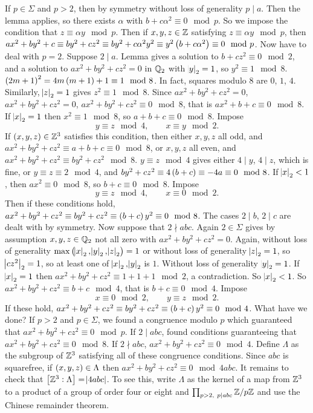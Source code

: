 If $ p \in \Sigma $ and $ p > 2 $, then by symmetry without loss of generality $ p \mid a $. Then the lemma applies, so there exists $ \alpha $ with $ b + c\alpha^2 \equiv 0 \mod p $. So we impose the condition that $ z \equiv \alpha y \mod p $. Then if $ x, y, z \in \mathbb{Z} $ satisfying $ z \equiv \alpha y \mod p $, then $ ax^2 + by^2 + c \equiv by^2 + cz^2 \equiv by^2 + c\alpha^2y^2 \equiv y^2\br{b + c\alpha^2} \equiv 0 \mod p $. Now have to deal with $ p = 2 $. Suppose $ 2 \mid a $. Lemma gives a solution to $ b + cz^2 \equiv 0 \mod 2 $, and a solution to $ ax^2 + by^2 + cz^2 = 0 $ in $ \mathbb{Q}_2 $ with $ \abs{y}_2 = 1 $, so $ y^2 \equiv 1 \mod 8 $. $ \br{2m + 1}^2 = 4m\br{m + 1} + 1 \equiv 1 \mod 8 $. In fact, squares modulo $ 8 $ are $ 0 $, $ 1 $, $ 4 $. Similarly, $ \abs{z}_2 = 1 $ gives $ z^2 \equiv 1 \mod 8 $. Since $ ax^2 + by^2 + cz^2 = 0 $, $ ax^2 + by^2 + cz^2 = 0 $, $ ax^2 + by^2 + cz^2 \equiv 0 \mod 8 $, that is $ ax^2 + b + c \equiv 0 \mod 8 $. If $ \abs{x}_2 = 1 $ then $ x^2 \equiv 1 \mod 8 $, so $ a + b + c \equiv 0 \mod 8 $. Impose
$$ y \equiv z \mod 4, \qquad x \equiv y \mod 2. $$
If $ \br{x, y, z} \in \Z^3 $ satisfies this condition, then either $ x, y, z $ all odd, and $ ax^2 + by^2 + cz^2 \equiv a + b + c \equiv 0 \mod 8 $, or $ x, y, z $ all even, and $ ax^2 + by^2 + cz^2 \equiv by^2 + cz^2 \mod 8 $. $ y \equiv z \mod 4 $ gives either $ 4 \mid y $, $ 4 \mid z $, which is fine, or $ y \equiv z \equiv 2 \mod 4 $, and $ by^2 + cz^2 \equiv 4\br{b + c} \equiv -4a \equiv 0 \mod 8 $. If $ \abs{x}_2 < 1 $, then $ ax^2 \equiv 0 \mod 8 $, so $ b + c \equiv 0 \mod 8 $. Impose
$$ y \equiv z \mod 4, \qquad x \equiv 0 \mod 2. $$
Then if these conditions hold, $ ax^2 + by^2 + cz^2 \equiv by^2 + cz^2 \equiv \br{b + c}y^2 \equiv 0 \mod 8 $. The cases $ 2 \mid b $, $ 2 \mid c $ are dealt with by symmetry. Now suppose that $ 2 \nmid abc $. Again $ 2 \in \Sigma $ gives by assumption $ x, y, z \in \mathbb{Q}_2 $ not all zero with $ ax^2 + by^2 + cz^2 = 0 $. Again, without loss of generality $ \max\br{\abs{x}_2, \abs{y}_2, \abs{z}_2} = 1 $ or without loss of generality $ \abs{z}_2 = 1 $, so $ \abs{cz^2}_2 = 1 $, so at least one of $ \abs{x}_2, \abs{y}_2 $ is $ 1 $. Without loss of generality $ \abs{y}_2 = 1 $. If $ \abs{x}_2 = 1 $ then $ ax^2 + by^2 + cz^2 \equiv 1 + 1 + 1 \mod 2 $, a contradiction. So $ \abs{x}_2 < 1 $. So $ ax^2 + by^2 + cz^2 \equiv b + c \mod 4 $, that is $ b + c \equiv 0 \mod 4 $. Impose
$$ x \equiv 0 \mod 2, \qquad y \equiv z \mod 2. $$
If these hold, $ ax^2 + by^2 + cz^2 \equiv by^2 + cz^2 \equiv \br{b + c}y^2 \equiv 0 \mod 4 $. What have we done? If $ p > 2 $ and $ p \in \Sigma $, we found a congruence modulo $ p $ which guaranteed that $ ax^2 + by^2 + cz^2 \equiv 0 \mod p $. If $ 2 \mid abc $, found conditions guaranteeing that $ ax^2 + by^2 + cz^2 \equiv 0 \mod 8 $. If $ 2 \nmid abc $, $ ax^2 + by^2 + cz^2 \equiv 0 \mod 4 $. Define $ \Lambda $ as the subgroup of $ \mathbb{Z}^3 $ satisfying all of these congruence conditions. Since $ abc $ is squarefree, if $ \br{x, y, z} \in \Lambda $ then $ ax^2 + by^2 + cz^2 \equiv 0 \mod 4abc $. It remains to check that $ \sbr{\Z^3 : \Lambda} = \abs{4abc} $. To see this, write $ \Lambda $ as the kernel of a map from $ \mathbb{Z}^3 $ to a product of a group of order four or eight and $ \prod_{p > 2, \ p \mid abc} \mathbb{Z} / p\mathbb{Z} $ and use the Chinese remainder theorem.

